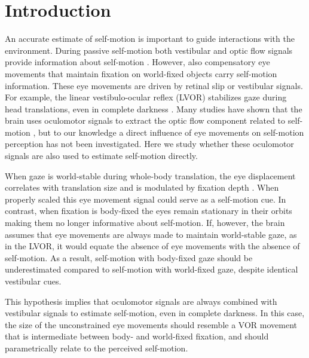 \newpage


\section{Introduction}

An accurate estimate of self-motion is important to guide interactions with the environment. During passive self-motion both vestibular and optic flow signals provide information about self-motion \cite{gibson1955, benson1986, harris2000, israel1989, angelaki2005, carriot2013, chen2010}. However, also compensatory eye movements that maintain fixation on world-fixed objects carry self-motion information. These eye movements are driven by retinal slip or vestibular signals. For example, the linear vestibulo-ocular reflex (LVOR) stabilizes gaze during head translations, even in complete darkness \cite{paige1989,medendorp2002,angelaki2004}.  Many studies have shown that the brain uses oculomotor signals to extract the optic flow component related to self-motion \cite{warren1988, royden1992, freeman1998, lappe1999}, but to our knowledge a direct influence of eye movements on self-motion perception has not been investigated. Here we study whether these oculomotor signals are also used to estimate self-motion directly.

When gaze is world-stable during whole-body translation, the eye displacement correlates with translation size and is modulated by fixation depth \cite{schwarz1989, paige1998, mchenry2000, medendorp2002}. When properly scaled this eye movement signal could serve as a self-motion cue. In contrast, when fixation is body-fixed the eyes remain stationary in their orbits \cite{paige1998, ramat2005} making them no longer informative about self-motion. If, however, the brain assumes that eye movements are always made to maintain world-stable gaze, as in the LVOR, it would equate the absence of eye movements with the absence of self-motion. As a result, self-motion with body-fixed gaze should be underestimated compared to self-motion with world-fixed gaze, despite identical vestibular cues.

This hypothesis implies that oculomotor signals are always combined with vestibular signals to estimate self-motion, even in complete darkness.  In this case, the size of the unconstrained eye movements should resemble a VOR movement that is intermediate between body- and world-fixed fixation, and should parametrically relate to the perceived self-motion.

